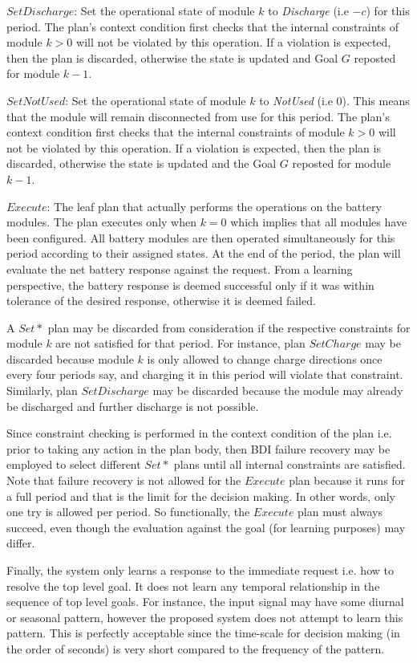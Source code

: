 $SetDischarge$: Set the operational state of module $k$ to {\em Discharge} (i.e $-c$) for this period. The plan's context condition first checks that the internal constraints of module $k>0$ will not be violated by this operation. If a violation is expected, then the plan is discarded, otherwise the state is updated and Goal $G$ reposted for module $k-1$.

$SetNotUsed$: Set the operational state of module $k$ to {\em NotUsed} (i.e $0$). This means that the module will remain disconnected from use for this period. The plan's context condition first checks that the internal constraints of module $k>0$ will not be violated by this operation. If a violation is expected, then the plan is discarded, otherwise the state is updated and the Goal $G$ reposted for module $k-1$.

$Execute$: The leaf plan that actually performs the operations on the battery modules. The plan executes only when $k=0$ which implies that all modules have been configured. All battery modules are then operated simultaneously for this period according to their assigned states. At the end of the period, the plan will evaluate the net battery response against the request. From a learning perspective, the battery response is deemed successful only if it was within tolerance of the desired response, otherwise it is deemed failed.

A $Set*$ plan may be discarded from consideration if the respective constraints for module $k$ are not satisfied for that period. For instance, plan $SetCharge$ may be discarded because module $k$ is only allowed to change charge directions once every four periods say, and charging it in this period will violate that constraint. Similarly, plan $SetDischarge$ may be discarded because the module may already be discharged and further discharge is not possible. 

Since constraint checking is performed in the context condition of the plan i.e. prior to taking any action in the plan body, then BDI failure recovery may be employed to select different $Set*$ plans until all internal constraints are satisfied. Note that failure recovery is not allowed for the $Execute$ plan because it runs for a full period and that is the limit for the decision making. In other words, only one try is allowed per period. So functionally, the $Execute$ plan must always succeed, even though the evaluation against the goal (for learning purposes) may differ.

Finally, the system only learns a response to the immediate request i.e. how to resolve the top level goal. It does not learn any temporal relationship in the sequence of top level goals. For instance, the input signal may have some diurnal or seasonal pattern, however the proposed system does not attempt to learn this pattern. This is perfectly acceptable since the time-scale for decision making (in the order of seconds) is very short compared to the frequency of the pattern.

